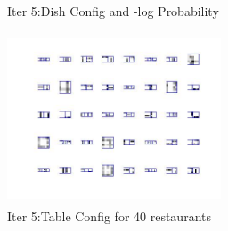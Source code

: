 \documentclass{article}
\begin{document}
\begin{spacing}{1.1}
\begin{figure}[h]
\begin{minipage}[b]{0.5\textwidth}
    \caption{Iter 5:Dish Config and -log Probability}
    \label{fig:by:table} 
  \end{minipage}%
  \begin{minipage}[b]{0.5\textwidth} 
    \centering 
    \includegraphics[width=2.5in,height=2in]{init1_5_nmt85_5.jpg} 
    \caption{Iter 5:Table Config for 40 restaurants}
    \label{fig:by:table}  
   \end{minipage}%
\end{figure}

\end{spacing}
\end{document}
